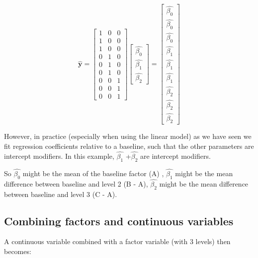 \documentclass[
  oneside]{krantz}
\begin{document}
\[
\hat{\mathbf{y}} = 
\left[\begin{array}
{ccc}
1 & 0 & 0\\
 1 & 0 &  0\\  
1 & 0 & 0\\ 
0 & 1 &  0\\
 0 & 1 &  0\\  
0 & 1 & 0\\
0 & 0 &  1\\
 0 & 0 &  1\\  
0 & 0 & 1
\end{array}\right]
\left[\begin{array}
{r}
\hat{\beta_0}  \\
\hat{\beta_1}  \\
\hat{\beta_2}
\end{array}\right]
= 
\left[\begin{array}
{r}
\hat{\beta_0}  \\
\hat{\beta_0}  \\
\hat{\beta_0}  \\
\hat{\beta_1}  \\
 \hat{\beta_1} \\
 \hat{\beta_1} \\ \hat{\beta_2} \\
 \hat{\beta_2} \\
 \hat{\beta_2} 
\end{array}\right]
\]

However, in practice (especially when using the linear model) as we have seen we fit regression coefficients relative to a baseline, such that the other parameters are intercept modifiers. In this example, \(\hat{\beta_1}\) +\(\hat{\beta_2}\) are intercept modifiers.

So \(\hat{\beta_0}\) might be the mean of the baseline factor (A) , \(\hat{\beta_1}\) might be the mean difference between baseline and level 2 (B - A), \(\hat{\beta_2}\) might be the mean difference between baseline and level 3 (C - A).

\hypertarget{combining-factors-and-continuous-variables}{%
\subsection{Combining factors and continuous variables}\label{combining-factors-and-continuous-variables}}

A continuous variable combined with a factor variable (with 3 levels) then becomes:
\end{document}
